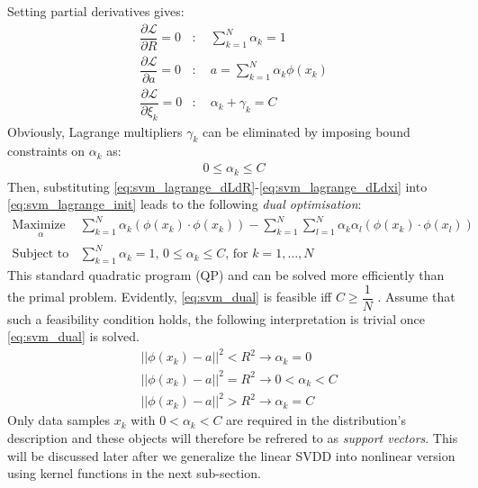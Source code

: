 \documentclass[3p]{elsarticle}
\theoremstyle{problemstyle}
\begin{document}
Setting partial derivatives gives:
\begin{align}
\dfrac{\partial \mathcal{L}}{\partial R} = 0 &: \quad \sum_{k=1}^N \alpha_k = 1 \label{eq:svm_lagrange_dLdR} \\
\dfrac{\partial \mathcal{L}}{\partial a} = 0 &: \quad a = \sum_{k=1}^N \alpha_k \phi \left( x_k \right) \label{eq:svm_lagrange_dLda} \\
\dfrac{\partial \mathcal{L}}{\partial \xi_k} = 0 &: \quad \alpha_k + \gamma_k = C \label{eq:svm_lagrange_dLdxi}
\end{align}
Obviously, Lagrange multipliers $\gamma_k$ can be eliminated by imposing bound constraints on $\alpha_k$ as:
\begin{align}
0\le \alpha_k \le C
\end{align}
Then, substituting \eqref{eq:svm_lagrange_dLdR}-\eqref{eq:svm_lagrange_dLdxi} into \eqref{eq:svm_lagrange_init} leads to the following \emph{dual optimisation}:
\begin{subequations}\label{eq:svm_dual}
\begin{align}
\underset{
	\begin{array}{c}
		 \alpha
	\end{array}}{\text{Maximize }} &\sum_{k=1}^N \alpha_k \left( \phi \left( x_k \right) \cdot \phi \left( x_k \right) \right) - \sum_{k=1}^N \sum_{l=1}^N \alpha_k \alpha_l \left( \phi \left( x_k \right) \cdot \phi \left( x_l \right) \right) \\
\text{Subject to } &\sum_{k=1}^N \alpha_k = 1 \text{, } 0 \le \alpha_k \le C \text{, for } k=1,\dots,N
\end{align}
\end{subequations}
This standard quadratic program (QP) and can be solved more efficiently than the primal problem. Evidently, \eqref{eq:svm_dual} is feasible iff $C \ge \dfrac{1}{N}$ \cite{chang2013revisit}. Assume that such a feasibility condition holds, the following interpretation is trivial once \eqref{eq:svm_dual} is solved.
\begin{subequations}
\begin{align}
&\left|\left| \phi \left( x_k \right) - a \right|\right|^2 < R^2 \to \alpha_k = 0 \\
&\left|\left| \phi \left( x_k \right) - a \right|\right|^2 = R^2 \to 0 < \alpha_k < C \label{eq:sv_alpha}\\
&\left|\left| \phi \left( x_k \right) - a \right|\right|^2 > R^2 \to \alpha_k = C
\end{align}
\end{subequations}
Only data samples $x_k$ with $0 < \alpha_k < C$ are required in the distribution's description and these objects will therefore be refrered to as \emph{support vectors}. This will be discussed later after we generalize the linear SVDD into nonlinear version using kernel functions in the next sub-section. 
\end{document}
